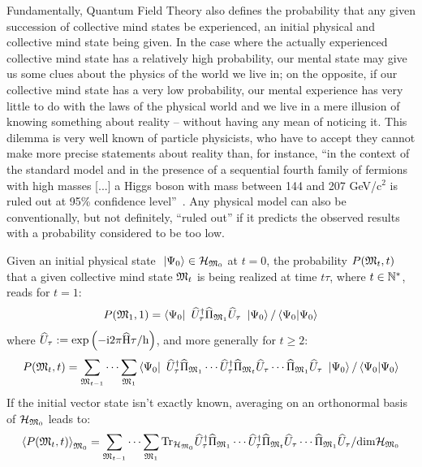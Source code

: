 \documentclass[10pt,a4paper,twoside,openany]{book}
\begin{document}
Fundamentally, Quantum Field Theory also defines the probability that any given succession of collective mind states be experienced, an initial physical and collective mind state being given. In the case where the actually experienced collective mind state has a relatively high probability, our mental state may give us some clues about the physics of the world we live in; on the opposite, if our collective mind state has a very low probability, our mental experience has very little to do with the laws of the physical world and we live in a mere illusion of knowing something about reality -- without having any mean of noticing it. This dilemma is very well known of particle physicists, who have to accept they cannot make more precise statements about reality than, for instance, ``in the context of the standard model and in the presence of a sequential fourth family of fermions with high masses [...] a Higgs boson with mass between 144 and 207 GeV/$\mathrm{c}^2$ is ruled out at 95\% confidence level''~\cite{CMS2011}. Any physical model can also be conventionally, but not definitely, ``ruled out'' if it predicts the observed results with a probability considered to be too low.

Given an initial physical state $\ \left|{\Psi_0}\right\rangle \in \mathcal H_{\mathfrak{M}_0}$ at $t = 0$, the probability $P(\mathfrak{M}_t,t)$ that a given collective mind state $\mathfrak{M}_t$ is being realized at time $t \tau$, where $t \in \mathbb{N}^*$, reads for $t = 1$:
\begin{equation*}
P(\mathfrak{M}_1,1) = \left\langle{\Psi_0}\right|\  \widehat{U}^{\dagger}_\tau \widehat{\Pi}_{\mathfrak{M}_1} \widehat{U}_\tau \ \left|{\Psi_0}\right\rangle / \left\langle{\Psi_0}|{\Psi_0}\right\rangle
\end{equation*}
where $\widehat{U}_\tau := \mathrm{exp} \left( {- \mathrm{i} 2 \pi \widehat{\mathrm H} \tau / \mathrm h} \right)$, and more generally for $t \geq 2$:
\begin{equation*}
P(\mathfrak{M}_t,t) = \sum_{\mathfrak{M}_{t - 1}} \dotsm \sum_{\mathfrak{M}_1} \left\langle{\Psi_0}\right|\  \widehat{U}^{\dagger}_\tau \widehat{\Pi}_{\mathfrak{M}_1} \dotsm \widehat{U}^{\dagger}_\tau \widehat{\Pi}_{\mathfrak{M}_t} \widehat{U}_\tau \dotsm \widehat{\Pi}_{\mathfrak{M}_1} \widehat{U}_\tau \ \left|{\Psi_0}\right\rangle / \left\langle{\Psi_0}|{\Psi_0}\right\rangle
\end{equation*}
If the initial vector state isn't exactly known, averaging on an orthonormal basis of $\mathcal H_{\mathfrak{M}_0}$ leads to:
\begin{equation*}
\left< P(\mathfrak{M}_t,t) \right>_{\mathfrak{M}_0} = \sum_{\mathfrak{M}_{t - 1}} \dotsm \sum_{\mathfrak{M}_1} \mathrm{Tr}_{\mathcal H_{\mathfrak{M}_0}} \widehat{U}^{\dagger}_\tau \widehat{\Pi}_{\mathfrak{M}_1} \dotsm \widehat{U}^{\dagger}_\tau \widehat{\Pi}_{\mathfrak{M}_t} \widehat{U}_\tau \dotsm \widehat{\Pi}_{\mathfrak{M}_1} \widehat{U}_\tau / \mathrm{dim} \mathcal H_{\mathfrak{M}_0}
\end{equation*}
\end{document}
